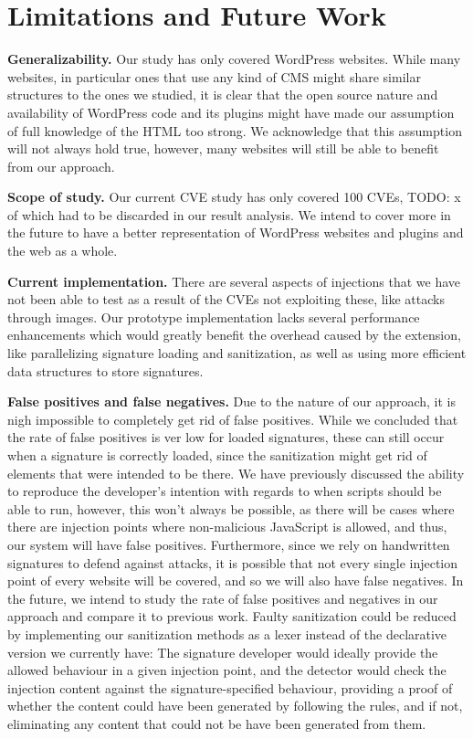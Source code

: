 \section{Limitations and Future Work}
\textbf{Generalizability.} Our study has only covered WordPress websites. While many websites, in particular ones that use any kind of CMS might share similar structures to the ones we studied, it is clear that the open source nature and availability of WordPress code and its plugins might have made our assumption of full knowledge of the HTML too strong. We acknowledge that this assumption will not always hold true, however, many websites will still be able to benefit from our approach.

\textbf{Scope of study.} Our current CVE study has only covered 100 CVEs, TODO: x of which had to be discarded in our result analysis. We intend to cover more in the future to have a better representation of WordPress websites and plugins and the web as a whole. 

\textbf{Current implementation.} There are several aspects of injections that we have not been able to test as a result of the CVEs not exploiting these, like attacks through images. Our prototype implementation lacks several performance enhancements which would greatly benefit the overhead caused by the extension, like parallelizing signature loading and sanitization, as well as using more efficient data structures to store signatures. 

\textbf{False positives and false negatives.} Due to the nature of our approach, it is nigh impossible to completely get rid of false positives. While we concluded that the rate of false positives is ver low for loaded signatures, these can still occur when a signature is correctly loaded, since the sanitization might get rid of elements that were intended to be there. We have previously discussed the ability to reproduce the developer's intention with regards to when scripts should be able to run, however, this won't always be possible, as there will be cases where there are injection points where non-malicious JavaScript is allowed, and thus, our system will have false positives. Furthermore, since we rely on handwritten signatures to defend against attacks, it is possible that not every single injection point of every website will be covered, and so we will also have false negatives. In the future, we intend to study the rate of false positives and negatives in our approach and compare it to previous work. Faulty sanitization could be reduced by implementing our sanitization methods as a lexer instead of the declarative version we currently have: The signature developer would ideally provide the allowed behaviour in a given injection point, and the detector would check the injection content against the signature-specified behaviour, providing a proof of whether the content could have been generated by following the rules, and if not, eliminating any content that could not be have been generated from them.

